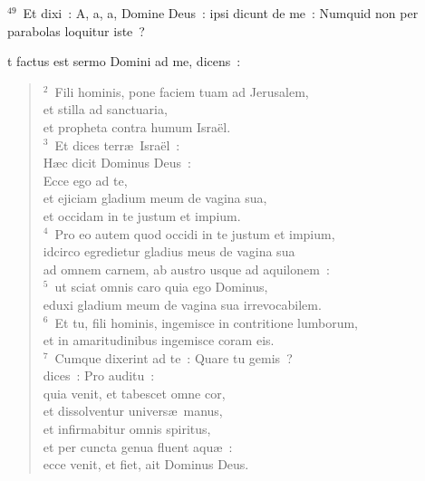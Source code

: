 ${}^{49}$~Et dixi~: A, a, a, Domine Deus~: ipsi dicunt de me~: Numquid non per parabolas loquitur iste~?

\bchapter
{}t factus est sermo Domini ad me, dicens~:
\begin{flushleft}\begin{verse}\vspace{6pt}${}^{2}$~Fili hominis, pone faciem tuam ad Jerusalem,\\ et stilla ad sanctuaria,\\ et propheta contra humum Isra\"el.\\
${}^{3}$~Et dices terr\ae\ Isra\"el~:\\ H\ae c dicit Dominus Deus~:\\ Ecce ego ad te,\\ et ejiciam gladium meum de vagina sua,\\ et occidam in te justum et impium.\\
${}^{4}$~Pro eo autem quod occidi in te justum et impium,\\ idcirco egredietur gladius meus de vagina sua\\ ad omnem carnem, ab austro usque ad aquilonem~:\\
${}^{5}$~ut sciat omnis caro quia ego Dominus,\\ eduxi gladium meum de vagina sua irrevocabilem.\\
${}^{6}$~Et tu, fili hominis, ingemisce in contritione lumborum,\\ et in amaritudinibus ingemisce coram eis.\\
${}^{7}$~Cumque dixerint ad te~: Quare tu gemis~?\\ dices~: Pro auditu~:\\ quia venit, et tabescet omne cor,\\ et dissolventur univers\ae\ manus,\\ et infirmabitur omnis spiritus,\\ et per cuncta genua fluent aqu\ae~:\\ ecce venit, et fiet, ait Dominus Deus.\end{verse}\end{flushleft}


